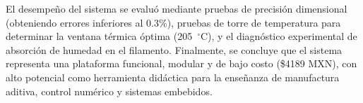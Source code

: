 El desempeño del sistema se evaluó mediante pruebas de precisión dimensional 
(obteniendo errores inferiores al 0.3\%), pruebas de torre de temperatura para 
determinar la ventana térmica óptima (205~$^\circ$C), y el diagnóstico 
experimental de absorción de humedad en el filamento. Finalmente, se concluye 
que el sistema representa una plataforma funcional, modular y de bajo costo 
(\$4189 MXN), con alto potencial como herramienta didáctica para la enseñanza 
de manufactura aditiva, control numérico y sistemas embebidos.

